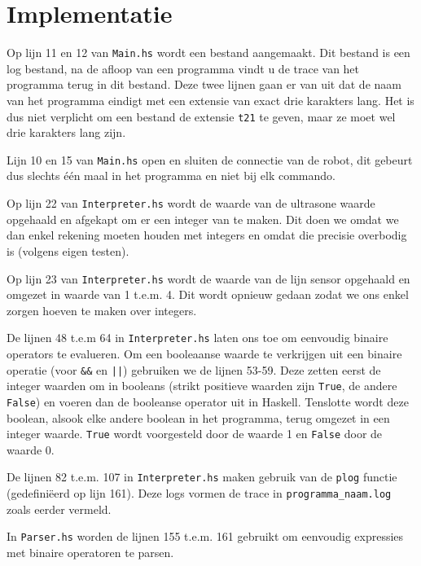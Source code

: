 \documentclass[a4paper]{article}
\begin{document}
\section{Implementatie}
Op lijn 11 en 12 van \verb|Main.hs| wordt een bestand aangemaakt. Dit bestand is een log bestand, na de afloop van een programma vindt u de trace van het programma terug in dit bestand. Deze twee lijnen gaan er van uit dat de naam van het programma eindigt met een extensie van exact drie karakters lang. Het is dus niet verplicht om een bestand de extensie \verb|t21| te geven, maar ze moet wel drie karakters lang zijn.

\par Lijn 10 en 15 van \verb|Main.hs| open en sluiten de connectie van de robot, dit gebeurt dus slechts \'e\'en maal in het programma en niet bij elk commando.

\par Op lijn 22 van \verb|Interpreter.hs| wordt de waarde van de ultrasone waarde opgehaald en afgekapt om er een integer van te maken. Dit doen we omdat we dan enkel rekening moeten houden met integers en omdat die precisie overbodig is (volgens eigen testen).

\par Op lijn 23 van \verb|Interpreter.hs| wordt de waarde van de lijn sensor opgehaald en omgezet in waarde van 1 t.e.m. 4. Dit wordt opnieuw gedaan zodat we ons enkel zorgen hoeven te maken over integers.

\par De lijnen 48 t.e.m 64 in \verb|Interpreter.hs| laten ons toe om eenvoudig binaire operators te evalueren. Om een booleaanse waarde te verkrijgen uit een binaire operatie (voor \verb|&&| en \verb~||~) gebruiken we de lijnen 53-59. Deze zetten eerst de integer waarden om in booleans (strikt positieve waarden zijn \verb|True|, de andere \verb|False|) en voeren dan de booleanse operator uit in Haskell. Tenslotte wordt deze boolean, alsook elke andere boolean in het programma, terug omgezet in een integer waarde. \verb|True| wordt voorgesteld door de waarde 1 en \verb|False| door de waarde 0.

\par De lijnen 82 t.e.m. 107 in \verb|Interpreter.hs| maken gebruik van de \verb|plog| functie (gedefini\"eerd op lijn 161). Deze logs vormen de trace in \verb|programma_naam.log| zoals eerder vermeld.

\par In \verb|Parser.hs| worden de lijnen 155 t.e.m. 161 gebruikt om eenvoudig expressies met binaire operatoren te parsen.
\end{document}
